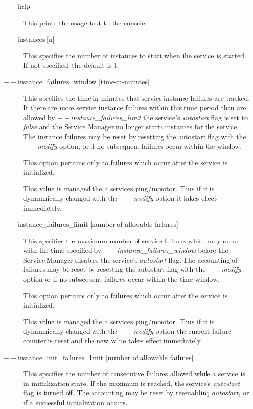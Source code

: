 \begin{description}
        \item[$--$help ] This prints the usage text to the console.

         \item[$--$instances {[n]}] This specifies the number of instances to start when the service
           is started.  If not specified, the default is 1.

        \item[$--$instance\_failures\_window {[time-in-minutes]}]
          This specifies the time in minutes that service instance failures are tracked.   If
          there are more service instance failures within this time period than are allowed
          by {\em$--$instance\_failures\_limit} the service's {\em autostart} flag is set to
          {\em false} and the Service Manager no longer starts instances for the service.
          The instance failures may be reset by resetting the autostart flag with
          the {\em $--$modify} option, or if no subsequent failures occur within the window.

          This option pertains only to failures which occur after the service is initialized.

          This value is managed the a services ping/monitor.  Thus if it is dynamnically changed
          with the {\em $--$modify} option it takes effect immediately.

        \item[$--$instance\_failures\_limit {[number of allowable failures]}]
          This specifies the maximum number of service failures which may occur with the
          time specified by {\em $--$instance\_failures\_window} before the Service Manager
          disables the service's {\em autostart} flag.  The accounting of failures may be
          reset by resetting the autostart flag with the {\em$--$modify} option or if
          no subsequent failures occur within the time window.

          This option pertains only to failures which occur after the service is initialized.

          This value is managed the a services ping/monitor.  Thus if it is dynamnically changed
          with the {\em $--$modify} option the current failure counter is reset and the 
          new value takes effect immediately.

        \item[$--$instance\_init\_failures\_limit {[number of allowable failures]}]
          This specifies the number of consecutive failures allowed while a service is in
          initialization state.   If the maximum is reached, the service's {\em autostart}
          flag is turned off.  The accounting may be reset by reeenabling {\em autostart}, or
          if a successful initialization occurs.


\end{description}
